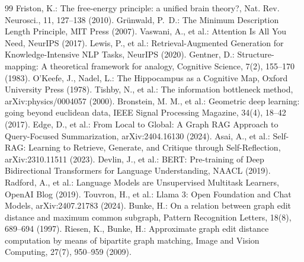 \begin{thebibliography}{99}
 Friston, K.: The free-energy principle: a unified brain theory?, Nat. Rev. Neurosci., 11, 127--138 (2010).
 Gr\"{u}nwald, P.~D.: The Minimum Description Length Principle, MIT Press (2007).
 Vaswani, A., et al.: Attention Is All You Need, NeurIPS (2017).
 Lewis, P., et al.: Retrieval-Augmented Generation for Knowledge-Intensive NLP Tasks, NeurIPS (2020).
 Gentner, D.: Structure-mapping: A theoretical framework for analogy, Cognitive Science, 7(2), 155--170 (1983).
 O'Keefe, J., Nadel, L.: The Hippocampus as a Cognitive Map, Oxford University Press (1978).
 Tishby, N., et al.: The information bottleneck method, arXiv:physics/0004057 (2000).
 Bronstein, M. M., et al.: Geometric deep learning: going beyond euclidean data, IEEE Signal Processing Magazine, 34(4), 18--42 (2017).
 Edge, D., et al.: From Local to Global: A Graph RAG Approach to Query-Focused Summarization, arXiv:2404.16130 (2024).
 Asai, A., et al.: Self-RAG: Learning to Retrieve, Generate, and Critique through Self-Reflection, arXiv:2310.11511 (2023).
 Devlin, J., et al.: BERT: Pre-training of Deep Bidirectional Transformers for Language Understanding, NAACL (2019).
 Radford, A., et al.: Language Models are Unsupervised Multitask Learners, OpenAI Blog (2019).
 Touvron, H., et al.: Llama 3: Open Foundation and Chat Models, arXiv:2407.21783 (2024).
 Bunke, H.: On a relation between graph edit distance and maximum common subgraph, Pattern Recognition Letters, 18(8), 689--694 (1997).
 Riesen, K., Bunke, H.: Approximate graph edit distance computation by means of bipartite graph matching, Image and Vision Computing, 27(7), 950--959 (2009).

\end{thebibliography}


